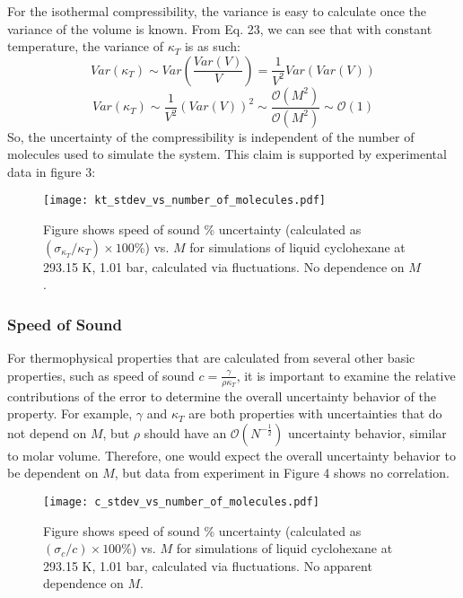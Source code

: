 \documentclass[aps,pre,twocolumn,nofootinbib,superscriptaddress,linenumbers,10pt, draft,tightenlines]{revtex4-1}
\begin{document}
For the isothermal compressibility, the variance is easy to calculate once the variance of the volume is known.  From Eq. 23, we can see that with constant temperature, the variance of $\kappa_T$ is as such:
\begin{equation}
Var(\kappa_T) \sim Var \left( \frac{Var(V)}{V}\right) = \frac{1}{V^2}Var(Var(V))
\end{equation}
\begin{equation}
Var(\kappa_T) \sim \frac{1}{V^2} (Var(V))^2 \sim \frac{\mathcal{O}(M^2)}{\mathcal{O}(M^2)} \sim \mathcal{O}(1)
\end{equation}
So, the uncertainty of the compressibility is independent of the number of molecules used to simulate the system.  This claim is supported by experimental data in figure 3:  
\begin{figure}[H]
\texttt{[image: kt\_stdev\_vs\_number\_of\_molecules.pdf]}
\caption{Figure shows speed of sound \% uncertainty (calculated as $(\sigma_{\kappa_T}/\kappa_T) \times 100 \%$) vs. $M$ for simulations of liquid cyclohexane at 293.15 K, 1.01 bar, calculated via fluctuations. No dependence on $M$.}
\end{figure}

\subsubsection{Speed of Sound}
For thermophysical properties that are calculated from several other basic properties, such as speed of sound $c=\frac{\gamma}{\rho \kappa_T}$, it is important to examine the relative contributions of the error to determine the overall uncertainty behavior of the property.  For example, $\gamma$ and $\kappa_T$ are both properties with uncertainties that do not depend on $M$, but $\rho$ should have an $\mathcal{O}(N^{-\frac{1}{2}})$ uncertainty behavior, similar to molar volume.  Therefore, one would expect the overall uncertainty behavior to be dependent on $M$, but data from experiment in Figure 4 shows no correlation. 
\begin{figure}[H]
\texttt{[image: c\_stdev\_vs\_number\_of\_molecules.pdf]}
\caption{Figure shows speed of sound \% uncertainty (calculated as $(\sigma_{c}/c) \times 100 \%$) vs. $M$ for simulations of liquid cyclohexane at 293.15 K, 1.01 bar, calculated via fluctuations. No apparent dependence on $M$.} 
\end{figure}
\end{document}

